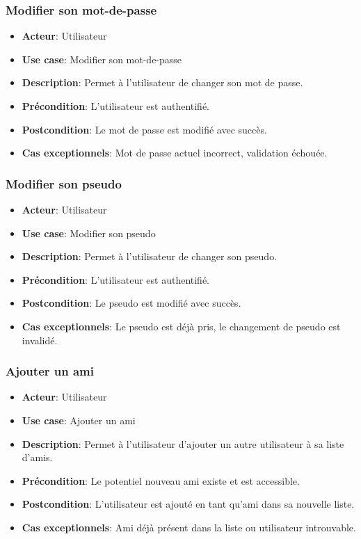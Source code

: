 \documentclass{article}
\begin{document}
\subsubsection*{Modifier son mot-de-passe}
\begin{itemize}
    \item \textbf{Acteur}: Utilisateur
    \item \textbf{Use case}: Modifier son mot-de-passe
    \item \textbf{Description}: Permet à l'utilisateur de changer son mot de passe.
    \item \textbf{Précondition}: L'utilisateur est authentifié.
    \item \textbf{Postcondition}: Le mot de passe est modifié avec succès.
    \item \textbf{Cas exceptionnels}: Mot de passe actuel incorrect, validation échouée.
\end{itemize}

\subsubsection*{Modifier son pseudo}
\begin{itemize}
    \item \textbf{Acteur}: Utilisateur
    \item \textbf{Use case}: Modifier son pseudo
    \item \textbf{Description}: Permet à l'utilisateur de changer son pseudo.
    \item \textbf{Précondition}: L'utilisateur est authentifié.
    \item \textbf{Postcondition}: Le pseudo est modifié avec succès.
    \item \textbf{Cas exceptionnels}: Le pseudo est déjà pris, le changement de pseudo est invalidé.
\end{itemize}

\subsubsection*{Ajouter un ami}
\begin{itemize}
    \item \textbf{Acteur}: Utilisateur
    \item \textbf{Use case}: Ajouter un ami
    \item \textbf{Description}: Permet à l'utilisateur d'ajouter un autre utilisateur à sa liste d'amis.
    \item \textbf{Précondition}: Le potentiel nouveau ami existe et est accessible.
    \item \textbf{Postcondition}: L'utilisateur est ajouté en tant qu'ami dans sa nouvelle liste.
    \item \textbf{Cas exceptionnels}: Ami déjà présent dans la liste ou utilisateur introuvable.
\end{itemize}
\end{document}
